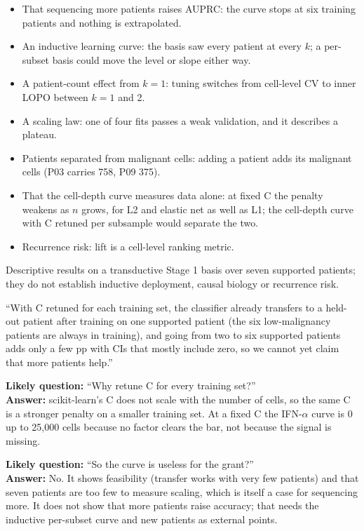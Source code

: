 \begin{caveatbox}
\begin{itemize}
\item That sequencing more patients raises AUPRC: the curve stops at six training patients and nothing is extrapolated.
\item An inductive learning curve: the basis saw every patient at every $k$; a per-subset basis could move the level or slope either way.
\item A patient-count effect from $k = 1$: tuning switches from cell-level CV to inner LOPO between $k = 1$ and 2.
\item A scaling law: one of four fits passes a weak validation, and it describes a plateau.
\item Patients separated from malignant cells: adding a patient adds its malignant cells (P03 carries 758, P09 375).
\item That the cell-depth curve measures data alone: at fixed C the penalty weakens as $n$ grows, for L2 and elastic net as well as L1; the cell-depth curve with C retuned per subsample would separate the two.
\item Recurrence risk: lift is a cell-level ranking metric.
\end{itemize}
Descriptive results on a transductive Stage 1 basis over seven supported patients; they do not establish inductive deployment, causal biology or recurrence risk.
\end{caveatbox}

\begin{teambox}
``With C retuned for each training set, the classifier already transfers to a held-out patient after training on one supported patient (the six low-malignancy patients are always in training), and going from two to six supported patients adds only a few pp with CIs that mostly include zero, so we cannot yet claim that more patients help.''

\textbf{Likely question:} ``Why retune C for every training set?''\\
\textbf{Answer:} scikit-learn's C does not scale with the number of cells, so the same C is a stronger penalty on a smaller training set. At a fixed C the IFN-$\alpha$ curve is 0 up to 25,000 cells because no factor clears the bar, not because the signal is missing.

\textbf{Likely question:} ``So the curve is useless for the grant?''\\
\textbf{Answer:} No. It shows feasibility (transfer works with very few patients) and that seven patients are too few to measure scaling, which is itself a case for sequencing more. It does not show that more patients raise accuracy; that needs the inductive per-subset curve and new patients as external points.
\end{teambox}

